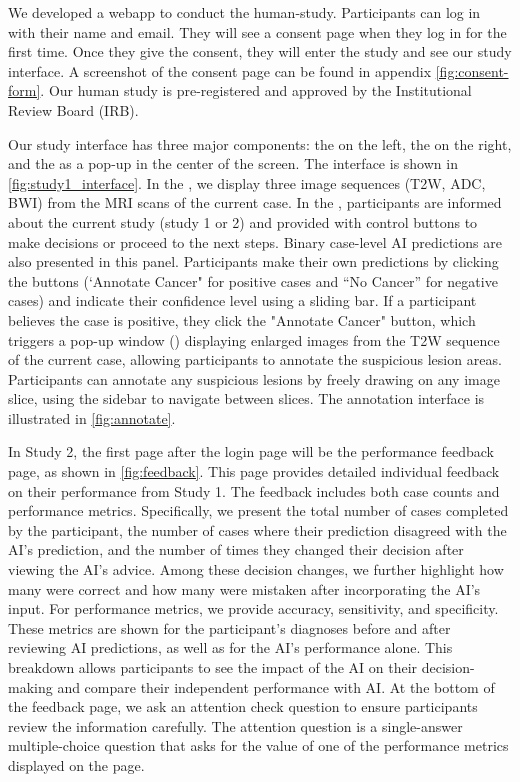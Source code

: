 We developed a webapp to conduct the human-study.
Participants can log in with their name and email.
They will see a consent page when they log in for the first time.
Once they give the consent, they will enter the study and see our study interface. A screenshot of the consent page can be found in appendix \cref{fig:consent-form}. Our human study is pre-registered and approved by the Institutional Review Board (IRB).

Our study interface has three major components: the \vp on the left, the \cp on the right, and the \ap as a pop-up in the center of the screen. 
The interface is shown in \cref{fig:study1_interface}.
In the \vp, we display three image sequences (T2W, ADC, BWI) from the MRI scans of the current case.
In the \cp, participants are informed about the current study (study 1 or 2) and provided with control buttons to make decisions or proceed to the next steps. 
Binary case-level AI predictions are also presented in this panel.  Participants make their own predictions by clicking the buttons (`Annotate Cancer" for positive cases and ``No Cancer'' for negative cases) and indicate their confidence level using a sliding bar.
If a participant believes the case is positive, they click the "Annotate Cancer" button, which triggers a pop-up window (\ap) displaying enlarged images from the T2W sequence of the current case, allowing participants to annotate the suspicious lesion areas. 
Participants can annotate any suspicious lesions by freely drawing on any image slice, using the sidebar to navigate between slices. 
The annotation interface is illustrated in \cref{fig:annotate}.

In Study 2, the first page after the login page will be the performance feedback page, as shown in \cref{fig:feedback}.
This page provides detailed individual feedback on their performance from Study 1.
The feedback includes both case counts and performance metrics. Specifically, we present the total number of cases completed by the participant, the number of cases where their prediction disagreed with the AI's prediction, and the number of times they changed their decision after viewing the AI's advice. Among these decision changes, we further highlight how many were correct and how many were mistaken after incorporating the AI's input.
For performance metrics, we provide accuracy, sensitivity, and specificity. These metrics are shown for the participant’s diagnoses before and after reviewing AI predictions, as well as for the AI’s performance alone. This breakdown allows participants to see the impact of the AI on their decision-making and compare their independent performance with AI.
At the bottom of the feedback page, we ask an attention check question to ensure participants review the information carefully.
The attention question is a single-answer multiple-choice question that asks for the value of one of the performance metrics displayed on the page.

